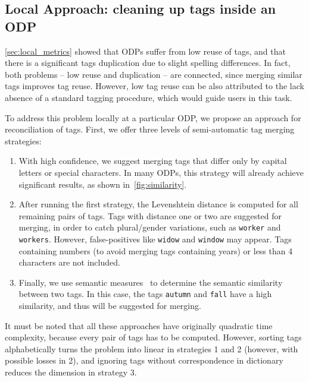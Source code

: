 \documentclass[conference]{IEEEtran}
\begin{document}

\subsection{Local Approach: cleaning up tags inside an ODP}
\label{sec:local}

\autoref{sec:local_metrics} showed that ODPs suffer from low reuse of tags, and that there is a significant tags duplication due to slight spelling differences. 
In fact, both problems -- low reuse and duplication -- are connected, since merging similar tags improves tag reuse.
However, low tag reuse can be also attributed to the lack absence of a standard tagging procedure, which would guide users in this task.

To address this problem locally at a particular ODP, we propose an approach for reconciliation of tags. %
First, we offer three levels of semi-automatic tag merging strategies:



\begin{enumerate}
	\item With high confidence, we suggest merging tags that differ only by capital letters or special characters. 
In many ODPs, this strategy will already achieve significant results, as shown in~\autoref{fig:similarity}.
	\item After running the first strategy, the Levenshtein distance is computed for all remaining pairs of tags.
Tags with distance one or two are suggested for merging, in order to catch plural/gender variations, such as \texttt{worker} and \texttt{workers}. 
However, false-positives like \texttt{widow} and \texttt{window} may appear.
Tags containing numbers (to avoid merging tags containing years) or less than 4 characters are not included.
	\item Finally, we use semantic measures~\cite{Harispe01032014} to determine the semantic similarity between two tags. 
In this case, the tags \texttt{autumn} and \texttt{fall} have a high similarity, and thus will be suggested for merging.
\end{enumerate}

It must be noted that all these approaches have originally quadratic time complexity, because every pair of tags has to be computed. However, sorting tags alphabetically turns the problem into linear in strategies 1 and 2 (however, with possible losses in 2), and ignoring tags without correspondence in dictionary reduces the dimension in strategy 3.
\end{document}
